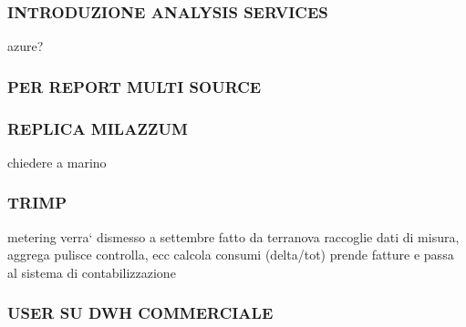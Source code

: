 
\subsubsection{INTRODUZIONE ANALYSIS SERVICES}
    azure?
\subsubsection{PER REPORT MULTI SOURCE}
\subsubsection{REPLICA MILAZZUM}
    chiedere a marino
\subsubsection{TRIMP}
    metering
    verra` dismesso a settembre
    fatto da terranova
    raccoglie dati di misura, aggrega pulisce controlla, ecc
    calcola consumi (delta/tot)
    prende fatture e passa al sistema di contabilizzazione
\subsubsection{USER SU DWH COMMERCIALE}
